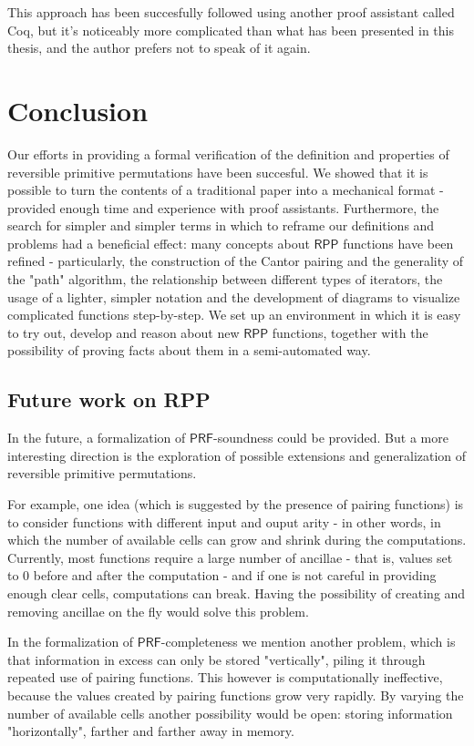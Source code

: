 \documentclass[oneside]{book}
\theoremstyle{definition}
\theoremstyle{remark}
\theoremstyle{plain}
\newcommand{\RPP}{\mathsf{RPP}}
\newcommand{\PRF}{\mathsf{PRF}}
\begin{document}
This approach has been succesfully followed using another proof assistant called Coq,
but it's noticeably more complicated than what has been presented in this thesis,
and the author prefers not to speak of it again.

\chapter{Conclusion}

Our efforts in providing a formal verification of the definition and properties of reversible primitive permutations have been succesful.
We showed that it is possible to turn the contents of a traditional paper into a mechanical format -
provided enough time and experience with proof assistants.
Furthermore, the search for simpler and simpler terms in which to reframe our definitions and problems
had a beneficial effect: many concepts about $\RPP$ functions have been refined -
particularly, the construction of the Cantor pairing and the generality of the "path" algorithm,
the relationship between different types of iterators,
the usage of a lighter, simpler notation and the development of diagrams to visualize complicated functions step-by-step.
We set up an environment in which it is easy to try out, develop and reason about new $\RPP$ functions,
together with the possibility of proving facts about them in a semi-automated way.

\section{Future work on RPP}

In the future, a formalization of $\PRF$-soundness could be provided.
But a more interesting direction is the exploration of possible extensions and generalization of reversible primitive permutations.

For example, one idea (which is suggested by the presence of pairing functions) is to consider functions with
different input and ouput arity - in other words, in which the number of available cells can grow and shrink during the computations.
Currently, most functions require a large number of ancillae - that is, values set to $0$ before and after the computation -
and if one is not careful in providing enough clear cells, computations can break.
Having the possibility of creating and removing ancillae on the fly would solve this problem.

In the formalization of $\PRF$-completeness we mention another problem,
which is that information in excess can only be stored "vertically", piling it through repeated use of pairing functions.
This however is computationally ineffective, because the values created by pairing functions grow very rapidly.
By varying the number of available cells another possibility would be open: storing information "horizontally",
farther and farther away in memory.
\end{document}
